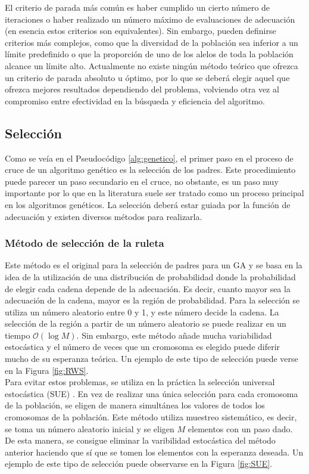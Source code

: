 El criterio de parada más común es haber cumplido un cierto número de iteraciones o haber realizado un número máximo de evaluaciones de adecuación (en esencia estos criterios son equivalentes). Sin embargo, pueden definirse criterios más complejos, como que la diversidad de la población sea inferior a un límite predefinido o que la proporción de uno de los alelos de toda la población alcance un límite alto. Actualmente no existe ningún método teórico que ofrezca un criterio de parada absoluto u óptimo, por lo que se deberá elegir aquel que ofrezca mejores resultados dependiendo del problema, volviendo otra vez al compromiso entre efectividad en la búsqueda y eficiencia del algoritmo.

\subsection{Selección}
Como se veía en el Pseudocódigo \ref{alg:genetico}, el primer paso en el proceso de cruce de un algoritmo genético es la selección de los padres. Este procedimiento puede parecer un paso secundario en el cruce, no obstante, es un paso muy importante por lo que en la literatura suele ser tratado como un proceso principal en los algoritmos genéticos. La selección deberá estar guiada por la función de adecuación y existen diversos métodos para realizarla.
\subsubsection{Método de selección de la ruleta}
Este método es el original para la selección de padres para un GA y se basa en la idea de la utilización de una distribución de probabilidad donde la probabilidad de elegir cada cadena depende de la adecuación. Es decir, cuanto mayor sea la adecuación de la cadena, mayor es la región de probabilidad. Para la selección se utiliza un número aleatorio entre 0 y 1, y este número decide la cadena. La selección de la región a partir de un número aleatorio se puede realizar en un tiempo $\mathcal{O}(\log M)$. Sin embargo, este método añade mucha variabilidad estocástica y el número de veces que un cromosoma es elegido puede diferir mucho de su esperanza teórica. Un ejemplo de este tipo de selección puede verse en la Figura \ref{fig:RWS}.\\

Para evitar estos problemas, se utiliza en la práctica la selección universal estocástica (SUE) \cite{beranek-1987}. En vez de realizar una única selección para cada cromosoma de la población, se eligen de manera simultánea los valores de todos los cromosomas de la población. Este método utiliza muestreo sistemático, es decir, se toma un número aleatorio inicial y se eligen $M$ elementos con un paso dado. De esta manera, se consigue eliminar la varibilidad estocástica del método anterior haciendo que sí que se tomen los elementos con la esperanza deseada. Un ejemplo de este tipo de selección puede observarse en la Figura \ref{fig:SUE}.\\

